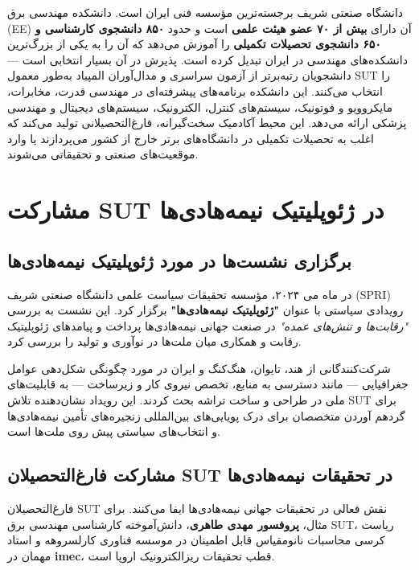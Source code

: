 \documentclass[10pt]{report}
\begin{document}
دانشگاه صنعتی شریف برجسته‌ترین مؤسسه فنی ایران است. دانشکده مهندسی برق (EE) آن دارای \textbf{بیش از ۷۰ عضو هیئت علمی} است و حدود \textbf{۸۵۰ دانشجوی کارشناسی و ۶۵۰ دانشجوی تحصیلات تکمیلی} را آموزش می‌دهد که آن را به یکی از بزرگ‌ترین دانشکده‌های مهندسی در ایران تبدیل کرده است. پذیرش در آن بسیار انتخابی است — دانشجویان رتبه‌برتر از آزمون سراسری و مدال‌آوران المپیاد به‌طور معمول SUT را انتخاب می‌کنند. این دانشکده برنامه‌های پیشرفته‌ای در مهندسی قدرت، مخابرات، مایکروویو و فوتونیک، سیستم‌های کنترل، الکترونیک، سیستم‌های دیجیتال و مهندسی پزشکی ارائه می‌دهد. این محیط آکادمیک سخت‌گیرانه، فارغ‌التحصیلانی تولید می‌کند که اغلب به تحصیلات تکمیلی در دانشگاه‌های برتر خارج از کشور می‌پردازند یا وارد موقعیت‌های صنعتی و تحقیقاتی می‌شوند.

\section{مشارکت SUT در ژئوپلیتیک نیمه‌هادی‌ها}

\subsection{برگزاری نشست‌ها در مورد ژئوپلیتیک نیمه‌هادی‌ها}

در ماه می ۲۰۲۴، مؤسسه تحقیقات سیاست علمی دانشگاه صنعتی شریف (SPRI) رویدادی سیاستی با عنوان \textbf{"ژئوپلیتیک نیمه‌هادی‌ها"} برگزار کرد. این نشست به بررسی \textit{"رقابت‌ها و تنش‌های عمده"} در صنعت جهانی نیمه‌هادی‌ها پرداخت و پیامدهای ژئوپلیتیک رقابت و همکاری میان ملت‌ها در نوآوری و تولید را بررسی کرد.

شرکت‌کنندگانی از هند، تایوان، هنگ‌کنگ و ایران در مورد چگونگی شکل‌دهی عوامل جغرافیایی — مانند دسترسی به منابع، تخصص نیروی کار و زیرساخت — به قابلیت‌های ملی در طراحی و ساخت تراشه بحث کردند. این رویداد نشان‌دهنده تلاش SUT برای گردهم آوردن متخصصان برای درک پویایی‌های بین‌المللی زنجیره‌های تأمین نیمه‌هادی‌ها و انتخاب‌های سیاستی پیش روی ملت‌ها است.

\subsection{مشارکت فارغ‌التحصیلان SUT در تحقیقات نیمه‌هادی‌ها}

فارغ‌التحصیلان SUT نقش فعالی در تحقیقات جهانی نیمه‌هادی‌ها ایفا می‌کنند. برای مثال، \textbf{پروفسور مهدی طاهری}، دانش‌آموخته کارشناسی مهندسی برق SUT، ریاست کرسی محاسبات نانومقیاس قابل اطمینان در موسسه فناوری کارلسروهه و استاد مهمان در \textbf{imec}، قطب تحقیقات ریزالکترونیک اروپا است.
\end{document}
